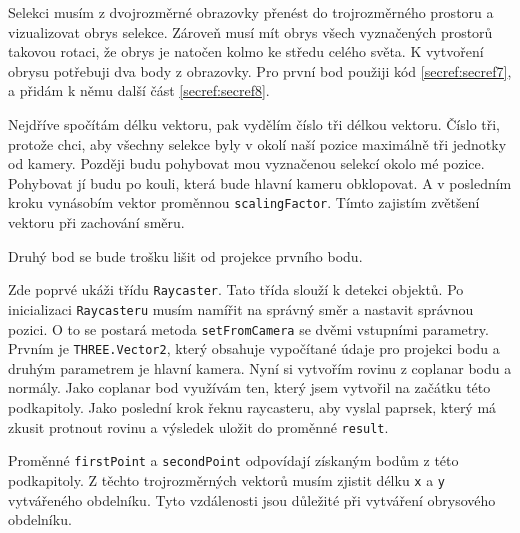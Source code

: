 \documentclass[czech,bachelor,dept420,male,cpdeclaration]{diploma}
\begin{document}
Selekci musím z dvojrozměrné obrazovky přenést do trojrozměrného prostoru a vizualizovat obrys selekce. Zároveň musí mít obrys všech vyznačených prostorů takovou rotaci, že obrys je natočen kolmo ke středu celého světa. K vytvoření obrysu potřebuji dva body z obrazovky. Pro první bod použiji kód \ref{secref:secref7}, a přidám k němu další část \ref{secref:secref8}.



Nejdříve spočítám délku vektoru, pak vydělím číslo tři délkou vektoru. Číslo tři, protože chci, aby všechny selekce byly v okolí naší pozice maximálně tři jednotky od kamery. Později budu pohybovat mou vyznačenou selekcí okolo mé pozice. Pohybovat jí budu po kouli, která bude hlavní kameru obklopovat. A v posledním kroku vynásobím vektor proměnnou \texttt{scalingFactor}. Tímto zajistím zvětšení vektoru při zachování směru. 

Druhý bod se bude trošku lišit od projekce prvního bodu. 



Zde poprvé ukáži třídu \texttt{Raycaster}. Tato třída slouží k detekci objektů. Po inicializaci \texttt{Raycasteru} musím namířit na správný směr a nastavit správnou pozici. O to se postará metoda \texttt{setFromCamera} se dvěmi vstupními parametry. Prvním je \texttt{THREE.Vector2}, který obsahuje vypočítané údaje pro projekci bodu a druhým parametrem je hlavní kamera. Nyní si vytvořím rovinu z coplanar bodu a normály. Jako coplanar bod využívám ten, který jsem vytvořil na začátku této podkapitoly. Jako poslední krok řeknu raycasteru, aby vyslal paprsek, který má zkusit protnout rovinu a výsledek uložit do proměnné \texttt{result}.


\begin{minipage}{\linewidth}
  
\end{minipage}

Proměnné \texttt{firstPoint} a \texttt{secondPoint} odpovídají získaným bodům z této podkapitoly. Z těchto trojrozměrných vektorů musím zjistit délku \texttt{x} a \texttt{y} vytvářeného obdelníku. Tyto vzdálenosti jsou důležité při vytváření obrysového obdelníku. 

 
\end{document}
